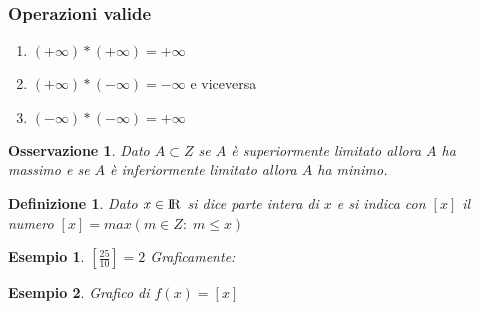 \documentclass[12pt, a4paper]{article}
\theoremstyle{break}
\newtheorem{definition}{Definizione}[subsection]
\newtheorem{example}{Esempio}[subsection]
\newtheorem{observation}{Osservazione}[subsection]
\newcommand\R{{\rm I\!R}}
\begin{document}
    \subsubsection{Operazioni valide}
    \begin{enumerate}
        \item $(+\infty)*(+\infty) = +\infty$
        \item $(+\infty)*(-\infty) = -\infty$ e viceversa
        \item $(-\infty)*(-\infty) = +\infty$
    \end{enumerate}
    \newpage
    \begin{observation}
        Dato $A\subset Z$ se $A$ è superiormente limitato allora $A$ ha massimo e se $A$ è inferiormente limitato
        allora $A$ ha minimo.
    \end{observation}
    \begin{definition}
        Dato $x\in\R$ si dice parte intera di $x$ e si indica con $[x]$ il numero $[x] = max(m\in Z :\; m\leq x)$
    \end{definition}
    \begin{example}
        $\left[\frac{25}{10}\right]=2$\newline\newline
        Graficamente:
    \end{example}
    \begin{figure}[!htb]
        \centering
    \end{figure}
    \begin{example}
        Grafico di $f(x)=[x]$
    \end{example}
    \begin{figure}[!htb]
        \centering
    \end{figure}
\end{document}
